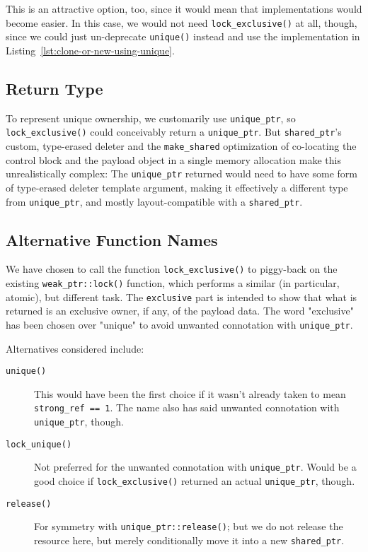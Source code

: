 \documentclass[11pt]{article}
\newcommand{\lockx}{\texttt{lock\_exclusive()}}
\newcommand{\uptr}{\texttt{unique\_ptr}}
\newcommand{\wptr}{\texttt{weak\_ptr}}
\newcommand{\sptr}{\texttt{shared\_ptr}}
\newcommand{\makeshared}{\texttt{make\_shared}}
\begin{document}
This is an attractive option, too, since it would mean that
implementations would become easier. In this case, we would not need
\lockx{} at all, though, since we could just un-deprecate
\texttt{unique()} instead and use the implementation in
Listing~\ref{lst:clone-or-new-using-unique}.

\subsection{Return Type}

To represent unique ownership, we customarily use \uptr, so \lockx{}
could conceivably return a \uptr. But \sptr{}'s custom, type-erased
deleter and the \makeshared{} optimization of co-locating the control
block and the payload object in a single memory allocation make this
unrealistically complex: The \uptr{} returned would need to have some
form of type-erased deleter template argument, making it effectively a
different type from \uptr, and mostly layout-compatible with a
\sptr{}.

\subsection{Alternative Function Names}

We have chosen to call the function \lockx{} to piggy-back on the
existing \texttt{\wptr::lock()} function, which performs a similar (in
particular, atomic), but different task. The \texttt{exclusive} part
is intended to show that what is returned is an exclusive owner, if
any, of the payload data. The word "exclusive" has been chosen over
"unique" to avoid unwanted connotation with \uptr.

Alternatives considered include:

\begin{description}
\item[\texttt{unique()}] This would have been the first choice if it
  wasn't already taken to mean \texttt{strong\_ref == 1}. The name
  also has said unwanted connotation with \uptr, though.
\item[\texttt{lock\_unique()}] Not preferred for the unwanted
  connotation with \uptr{}. Would be a good choice if \lockx{}
  returned an actual \uptr{}, though.
\item[\texttt{release()}] For symmetry with \texttt{\uptr::release()};
  but we do not release the resource here, but merely
  conditionally move it into a new \sptr{}.
\end{description}
\end{document}
